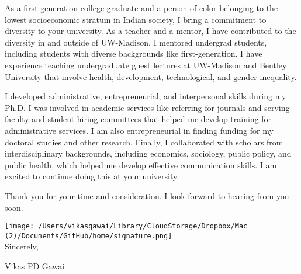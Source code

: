 \documentclass[12pt]{letter}
\begin{document}
As a first-generation college graduate and a person of color belonging to the lowest socioeconomic stratum in Indian society, I bring a commitment to diversity to your university. As a teacher and a mentor, I have contributed to the diversity in and outside of UW-Madison. I mentored undergrad students, including students with diverse backgrounds like first-generation. I have experience teaching undergraduate guest lectures at UW-Madison and Bentley University that involve health, development, technological, and gender inequality. 

I developed administrative, entrepreneurial, and interpersonal skills during my Ph.D. I was involved in academic services like referring for journals and serving faculty and student hiring committees that helped me develop training for administrative services. I am also entrepreneurial in finding funding for my doctoral studies and other research. Finally, I collaborated with scholars from interdisciplinary backgrounds, including economics, sociology, public policy, and public health, which helped me develop effective communication skills. I am excited to continue doing this at your university.

Thank you for your time and consideration. I look forward to hearing from you soon.

\bigskip

\texttt{[image: /Users/vikasgawai/Library/CloudStorage/Dropbox/Mac (2)/Documents/GitHub/home/signature.png]}  \\

\vspace*{-4.8\baselineskip}Sincerely, 

\vspace{1.25\baselineskip}Vikas PD Gawai
\end{document}
